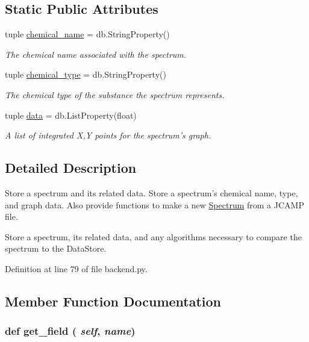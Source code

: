 \subsection*{Static Public Attributes}
\begin{DoxyCompactItemize}
\item 
tuple \hyperlink{classbackend_1_1_spectrum_a1a3576819984b70e068fa2a43a5b11df}{chemical\_\-name} = db.StringProperty()
\begin{DoxyCompactList}\small\item\em The chemical name associated with the spectrum. \item\end{DoxyCompactList}\item 
tuple \hyperlink{classbackend_1_1_spectrum_a97fd097feb78cab8b04a2ffd17a971d4}{chemical\_\-type} = db.StringProperty()
\begin{DoxyCompactList}\small\item\em The chemical type of the substance the spectrum represents. \item\end{DoxyCompactList}\item 
tuple \hyperlink{classbackend_1_1_spectrum_aa7a0efb8690a34f61a95b00cc723ca27}{data} = db.ListProperty(float)
\begin{DoxyCompactList}\small\item\em A list of integrated X,Y points for the spectrum's graph. \item\end{DoxyCompactList}\end{DoxyCompactItemize}


\subsection{Detailed Description}
Store a spectrum and its related data. Store a spectrum's chemical name, type, and graph data. Also provide functions to make a new \hyperlink{classbackend_1_1_spectrum}{Spectrum} from a JCAMP file.\begin{DoxyVerb}Store a spectrum, its related data, and any algorithms necessary
to compare the spectrum to the DataStore.\end{DoxyVerb}
 

Definition at line 79 of file backend.py.

\subsection{Member Function Documentation}
\hypertarget{classbackend_1_1_spectrum_af50426ecd14fc9667344dbf5407fb487}{
\subsubsection[{get\_\-field}]{\setlength{\rightskip}{0pt plus 5cm}def get\_\-field ( {\em self}, \/   {\em name})}}
\label{classbackend_1_1_spectrum_af50426ecd14fc9667344dbf5407fb487}


